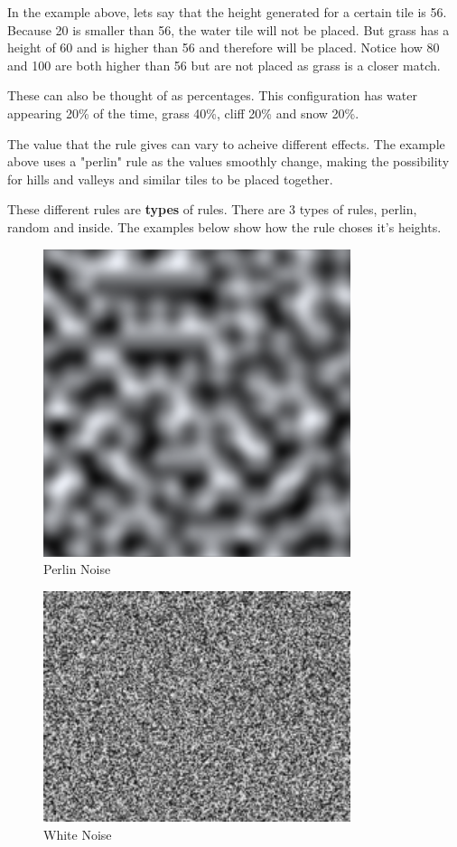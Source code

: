 \documentclass{book}
\begin{document}
In the example above, lets say that the height generated for a certain tile is 56. Because 20 is smaller than 56, the water tile will not be placed. But grass has a height of 60 and is higher than 56 and therefore will be placed. Notice how 80 and 100 are both higher than 56 but are not placed as grass is a closer match.

These can also be thought of as percentages. This configuration has water appearing 20\% of the time, grass 40\%, cliff 20\% and snow 20\%.

The value that the rule gives can vary to acheive different effects. The example above uses a "perlin" rule as the values smoothly change, making the possibility for hills and valleys and similar tiles to be placed together. 

These different rules are \textbf{types} of rules. There are 3 types of rules, perlin, random and inside. The examples below show how the rule choses it's heights.

\begin{figure}[ht!]
		\centering
		\includegraphics[width=90mm]{PerlinNoiseExample.png}
		\caption{Perlin Noise}
\end{figure}


\begin{figure}[ht!]
		\centering
		\includegraphics[width=90mm]{WhiteNoiseExample.png}
		\caption{White Noise}
\end{figure}
\end{document}
